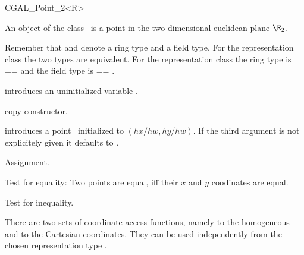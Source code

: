 
\begin{ccClassTemplate} {CGAL_Point_2<R>}

\ccDefinition
An object of the class \ccClassName\ is a point in the two-dimensional
euclidean plane $\E_2$. 



Remember that  and  denote a ring type
and a field type. For the representation class
 the two types are equivalent. For the
representation class  the ring type is
 ==  and the field type is  == 
.

\ccCreation
{}


\ccHidden {}
             {introduces an uninitialized variable \ccVar.}

\ccHidden {}
            {copy constructor.}

\ccUnchecked
{}
            {introduces a point \ccVar\ initialized to $(hx/hw,hy/hw)$.
             If the third argument is not explicitely given it defaults
             to .}

\ccOperations
\ccSetTwoOfThreeColumns{5cm}{4cm}

\ccHidden {}
        {Assignment.}

       {Test for equality: Two points are equal, iff their $x$ and $y$ 
        coodinates are equal.}

       {Test for inequality.}


There are two sets of coordinate access functions, namely to the
homogeneous and to the Cartesian coordinates. They can be used
independently from the chosen representation type .


\end{ccClassTemplate}

